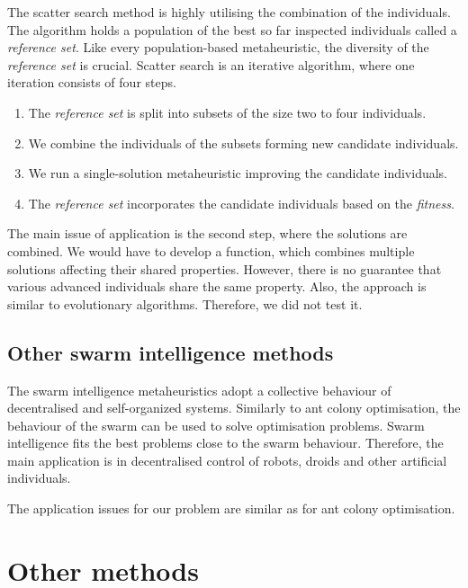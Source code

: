 \documentclass[
    digital,    %
    oneside,    %
    color,
    11pt,
    nocover,
    notable,
    nolof,
    nolot,
]{fithesis3}
\begin{document}
The scatter search method is highly utilising the combination of the individuals. The algorithm holds a population of the best so far inspected individuals called a \textit{reference set}. Like every population-based metaheuristic, the diversity of the \textit{reference set} is crucial. Scatter search is an iterative algorithm, where one iteration consists of four steps.

\begin{enumerate}
    \item The \textit{reference set} is split into subsets of the size two to four individuals.
    \item We combine the individuals of the subsets forming new candidate individuals.
    \item We run a single-solution metaheuristic improving the candidate individuals.
    \item The \textit{reference set} incorporates the candidate individuals based on the \textit{fitness}.
\end{enumerate}

The main issue of application is the second step, where the solutions are combined. We would have to develop a function, which combines multiple solutions affecting their shared properties. However, there is no guarantee that various advanced individuals share the same property. Also, the approach is similar to evolutionary algorithms. Therefore, we did not test it.

\subsection{Other swarm intelligence methods}
\label{subsec:opt-popul-si}

The swarm intelligence metaheuristics adopt a collective behaviour of decentralised and self-organized systems. Similarly to ant colony optimisation, the behaviour of the swarm can be used to solve optimisation problems. Swarm intelligence fits the best problems close to the swarm behaviour. Therefore, the main application is in decentralised control of robots, droids and other artificial individuals.

The application issues for our problem are similar as for ant colony optimisation.


\section{Other methods}
\label{sec:opt-other}
\end{document}
